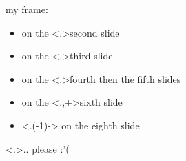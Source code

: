 \documentclass{beamer}
\begin{document}
    \begin{frame}
        my \alert<+>{frame}: \hfill {}
        \begin{itemize}
            \item<+-> on the \alert<.>{second} slide
            \item<+-> on the \alert<.>{third} slide
            \item<+-> on the \alert<.>{fourth} then the \alert<+>{fifth} slides
            \item<+-> on the \alert<.,+>{sixth} slide
            \item<.(-1)-> on the \alert<+>{eighth} slide
        \end{itemize}
        \visible<.>{.. please :'(}
    \end{frame}
\end{document}
